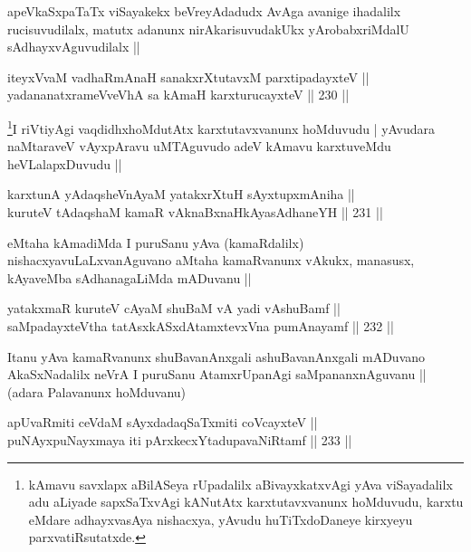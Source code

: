 \begin{artha}
apeVkaSxpaTaTx viSayakekx beVreyAdadudx AvAga avanige ihadalilx
rucisuvudilalx, matutx adanunx nirAkarisuvudakUkx yArobabxriMdalU
sAdhayxvAguvudilalx ||
\end{artha}

\begin{shl}
iteyxVvaM vadhaRmAnaH sanakxrXtutavxM parxtipadayxteV || \\
yadananatxrameVveVhA sa kAmaH karxturucayxteV ||  230 ||  
\end{shl}

\begin{artha}
\footnote{kAmavu savxlapx aBilASeya rUpadalilx aBivayxkatxvAgi yAva
  viSayadalilx adu aLiyade sapxSaTxvAgi kANutAtx karxtutavxvanunx
  hoMduvudu, karxtu eMdare adhayxvasAya nishacxya, yAvudu
  huTiTxdoDaneye kirxyeyu parxvatiRsutatxde.}I riVtiyAgi vaqdidhxhoMdutAtx karxtutavxvanunx hoMduvudu | yAvudara
naMtaraveV vAyxpAravu uMTAguvudo adeV kAmavu karxtuveMdu
heVLalapxDuvudu ||
\end{artha}


\begin{shl}
karxtunA yAdaqsheVnAyaM yatakxrXtuH sAyxtupxmAniha || \\
kuruteV tAdaqshaM kamaR vAknaBxnaHkAyasAdhaneYH ||  231 || 
\end{shl}

\begin{artha}
eMtaha kAmadiMda I puruSanu yAva (kamaRdalilx)
nishacxyavuLaLxvanAguvano aMtaha kamaRvanunx vAkukx, manasusx,
kAyaveMba sAdhanagaLiMda mADuvanu ||
\end{artha}

\begin{shl}
yatakxmaR kuruteV cAyaM shuBaM vA yadi vA\s shuBamf || \\
saMpadayxteV\s tha tatAsxkASxdAtamxtevxVna pumAnayamf ||  232 ||  
\end{shl}

\begin{artha}
Itanu yAva kamaRvanunx shuBavanAnxgali ashuBavanAnxgali mADuvano
AkaSxNadalilx neVrA I puruSanu AtamxrUpanAgi saMpananxnAguvanu ||
(adara Palavanunx hoMduvanu) 
\end{artha}


\begin{shl}
apUvaRmiti ceVdaM sAyxdadaqSaTxmiti coVcayxteV || \\
puNAyxpuNayxmaya iti pArxkecxYtadupavaNiRtamf ||  233 ||  
\end{shl}

